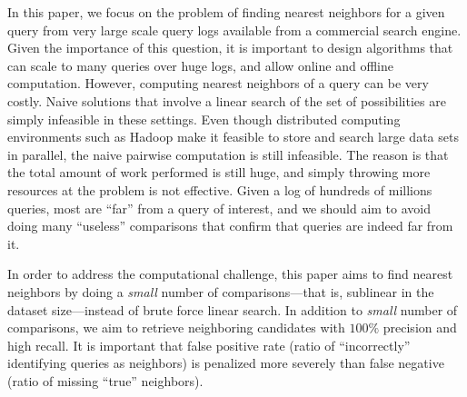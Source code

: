 In this paper, we focus on the problem of finding nearest neighbors
for a given query from very large scale query logs available from a commercial search engine. 
Given the importance of this question, it is important to design
algorithms that can scale to many queries over huge logs, and allow
online and offline computation. 
However, computing nearest neighbors of a query 
can be very costly. 
Naive solutions that involve a linear search of the set of possibilities
are simply infeasible in these settings. 
Even though distributed computing environments such as Hadoop
make it feasible to store and search large data sets in parallel, 
the naive pairwise computation is still infeasible. 
The reason is that the total amount of work performed is still huge,
and simply throwing more resources at the problem is not effective. 
Given a log of hundreds of millions queries, most are ``far'' from a
query of interest, and we should aim to avoid doing many ``useless''
comparisons that confirm that queries are indeed far from it. 

In order to address the computational challenge, this paper aims to find nearest neighbors by doing a 
\emph{small} number of comparisons---that is, sublinear in the dataset size---instead of brute force linear search. 
In addition to \emph{small} number of comparisons, we aim to 
retrieve neighboring candidates with  $100\%$ precision and high recall.
It is important that false positive rate (ratio of  ``incorrectly'' identifying queries as neighbors) is penalized more severely than false negative (ratio of missing ``true'' neighbors).

